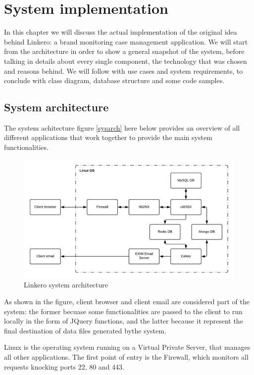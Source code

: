 \chapter{System implementation}

In this chapter we will discuss the actual implementation of the original idea
behind Linkero: a brand monitoring case management application. We will start
from the architecture in order to show a general snapshot of the system, before
talking in details about every single component, the technology that was
chosen and reasons behind. We will follow with use cases and
system requirements, to conclude with class diagram, database structure and some
code samples.

\section{System architecture}
The system achitecture figure \ref{sysarch} here below provides an overview of
all different applications that work together to provide the main system
functionalities.

\begin{figure}[h!]
\centering
\includegraphics[scale=0.8]{imgs/SystemArchitecture.pdf}
\caption{Linkero system architecture}
\label{fig:sysarch}
\end{figure}

As shown in the figure, client browser and client email are considered part of
the system: the former becuase some functionalities are passed to the client to
run locally in the form of JQuery functions, and the latter because it represent
the final destination of data files generated bythe system.

Linux is the operating system running on a Virtual Private Server, that manages
all other applications. The first point of entry is the Firewall, which monitors
all requests knocking ports 22, 80 and 443.

